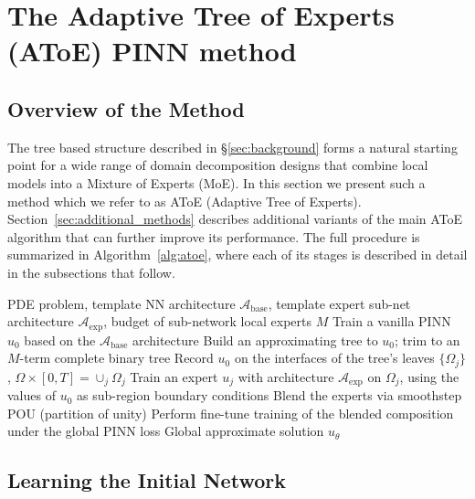 \section{The Adaptive Tree of Experts (AToE) PINN method}
\label{sec:method}

\subsection{Overview of the Method}
\label{sec:overview}

The tree based structure described in
\S\ref{sec:background} forms a natural starting point for a wide range of domain decomposition
designs that combine local models into a Mixture of Experts (MoE). In this
section we present such a method which we refer to as
AToE (Adaptive Tree of Experts). Section~\ref{sec:additional_methods}
describes additional variants of the main AToE algorithm that can further improve its performance. The full procedure is summarized in Algorithm~\ref{alg:atoe}, where each of
its stages is described in detail in the subsections that follow.

\begin{algorithm}[H]
\caption{AToE: Adaptive Tree of Experts}
\label{alg:atoe}
\begin{algorithmic}[1]
\Require PDE problem, template NN architecture $\mathcal{A}_{\mathrm{base}}$, template expert sub-net architecture $\mathcal{A}_{\mathrm{exp}}$, budget of sub-network local experts $M$
\State Train a vanilla PINN $u_0$ based on the $\mathcal{A}_{\mathrm{base}}$ architecture
\State Build an approximating tree to $u_0$; trim to an $M$-term complete binary tree
\State Record $u_0$ on the interfaces of the tree's leaves $\{\Omega_j\}$, $\Omega\times[0,T]=\cup_j \Omega_j$
    \State Train an expert $u_j$ with architecture  $\mathcal{A}_{\mathrm{exp}}$ on $\Omega_j$, using the values of $u_0$ as sub-region boundary conditions
\EndFor
\State Blend the experts via smoothstep POU (partition of unity)
\State Perform fine-tune training of the blended composition under the global PINN loss
\Ensure Global approximate solution $u_\theta$
\end{algorithmic}
\end{algorithm}

\vspace{0.5em}

\subsection{Learning the Initial Network}
\label{sec:root_training}

